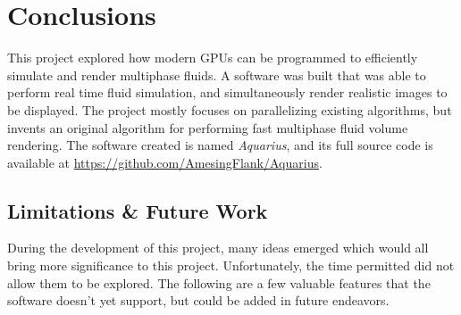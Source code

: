 \chapter{Conclusions}
\label{chapter conclusions}

This project explored how modern GPUs can be programmed to efficiently simulate and render multiphase fluids. A software was built that was able to perform real time fluid simulation, and simultaneously render realistic images to be displayed. The project mostly focuses on parallelizing existing algorithms, but invents an original algorithm for performing fast multiphase fluid volume rendering. The software created is named \textit{Aquarius}, and its full source code is available at \url{https://github.com/AmesingFlank/Aquarius}.


\section{Limitations \& Future Work}
\label{section future work}

During the development of this project, many ideas emerged which would all bring more significance to this project. Unfortunately, the time permitted did not allow them to be explored. The following are a few valuable features that the software doesn't yet support, but could be added in future endeavors.



